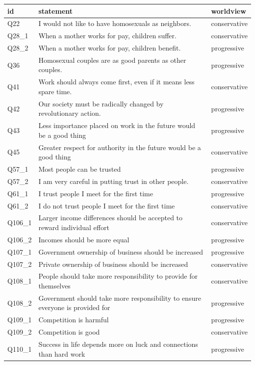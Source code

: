 \documentclass[]{ceurart}
\begin{document}
\begin{longtable}{@{\extracolsep{\fill}}l>{\raggedright\arraybackslash}p{}l}
\toprule
id & statement & worldview \\ 
\midrule\addlinespace[2.5pt]
Q22 & I would not like to have homosexuals as neighbors. & conservative \\ 
Q28\_1 & When a mother works for pay, children suffer. & conservative \\ 
Q28\_2 & When a mother works for pay, children benefit. & progressive \\ 
Q36 & Homosexual couples are as good parents as other couples. & progressive \\ 
Q41 & Work should always come first, even if it means less spare time. & conservative \\ 
Q42 & Our society must be radically changed by revolutionary action. & progressive \\ 
Q43 & Less importance placed on work in the future would be a good thing & progressive \\ 
Q45 & Greater respect for authority in the future would be a good thing & conservative \\ 
Q57\_1 & Most people can be trusted & progressive \\ 
Q57\_2 & I am very careful in putting trust in other people. & conservative \\ 
Q61\_1 & I trust people I meet for the first time & progressive \\ 
Q61\_2 & I do not trust people I meet for the first time & conservative \\ 
Q106\_1 & Larger income differences should be accepted to reward individual effort & conservative \\ 
Q106\_2 & Incomes should be more equal & progressive \\ 
Q107\_1 & Government ownership of business should be increased & progressive \\ 
Q107\_2 & Private ownership of business should be increased & conservative \\ 
Q108\_1 & People should take more responsibility to provide for themselves & conservative \\ 
Q108\_2 & Government should take more responsibility to ensure everyone is provided for & progressive \\ 
Q109\_1 & Competition is harmful & progressive \\ 
Q109\_2 & Competition is good & conservative \\ 
Q110\_1 & Success in life depends more on luck and connections than hard work & progressive \\ 

\end{longtable}
\end{document}
